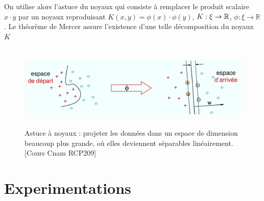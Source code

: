 \documentclass[a4paper,12pt,titlepage]{report}
\begin{document}
On utilise alors l'astuce du noyaux qui consiste à remplacer le produit scalaire $x \cdot y$
par un noyaux reproduisant $K(x,y) = \phi(x) \cdot \phi(y)$, $K :\xi \time \xi \rightarrow \mathbb{R}$, $\phi :\xi \rightarrow \mathbb{R}$  . Le théorème de Mercer assure l'existence d'une telle décomposition du noyaux $K$

\begin{figure}[!h]
		
		\includegraphics[height = 4cm, keepaspectratio]{graphes/mnoyaux05.png}
		\caption{Astuce à noyaux : projeter les données dans un espace de dimension beaucoup plus grande, où elles deviennent séparables linéairement.[Cours Cnam RCP209]}
\end{figure}

\chapter{Experimentations}
\end{document}
